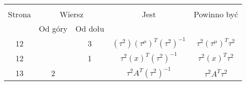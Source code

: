 \documentclass[a4paper,11pt]{article}
\begin{document}


\begin{center}

  \begin{tabular}{|c|c|c|c|c|}
    \hline
    & \multicolumn{2}{c|}{} & & \\
    Strona & \multicolumn{2}{c|}{Wiersz} & Jest
                              & Powinno być \\ \cline{2-3}
    & Od góry & Od dołu & & \\
    \hline
    12 & &  3 & $( \tau^{ 2 } )( \tau^{ \mu } )^{ T }( \tau^{ 2 } )^{ -1 }$
           & $\tau^{ 2 } ( \tau^{ \mu } )^{ T } \tau^{ 2 }$ \\
    12 & & 1 & $\tau^{ 2 } ( x )^{ T }( \tau^{ 2 } )^{ -1 }$
           & $\tau^{ 2 } ( x )^{ T } \tau^{ 2 }$ \\ %
    13 & 2 & & $\tau^{ 2 } A^{ T }( \tau^{ 2 } )^{ -1 }$
           & $\tau^{ 2 } A^{ T } \tau^{ 2 }$ \\
    \hline
  \end{tabular}

\end{center}




\vspace{\spaceTwo}











\end{document}
